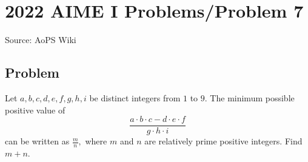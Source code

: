 \documentclass[12pt]{article}
\begin{document}
\section*{{2022 AIME I Problems/Problem 7}}
Source: AoPS Wiki

\subsection*{Problem}
Let $a,b,c,d,e,f,g,h,i$ be distinct integers from $1$ to $9.$ The minimum possible positive value of \[\dfrac{a \cdot b \cdot c - d \cdot e \cdot f}{g \cdot h \cdot i}\] can be written as $\frac{m}{n},$ where $m$ and $n$ are relatively prime positive integers. Find $m+n.$
\end{document}

